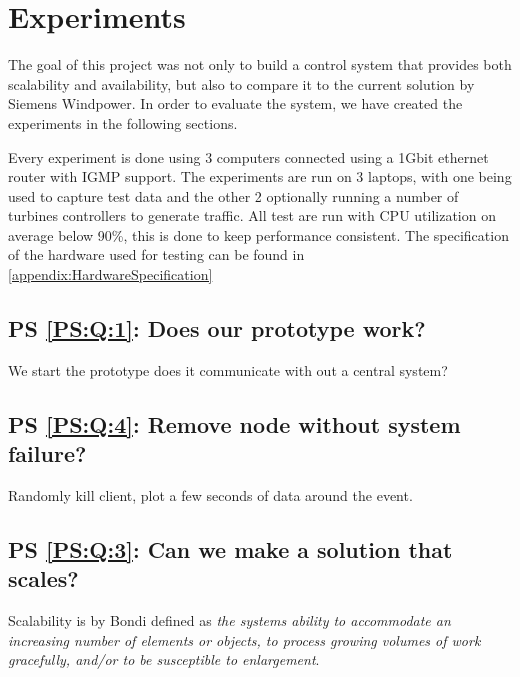 
\chapter{Experiments}


The goal of this project was not only to build a control system that provides both scalability and availability, but also to compare it to the current solution by Siemens Windpower. 
In order to evaluate the system, we have created the experiments in the following sections.

Every experiment is done using 3 computers connected using a 1Gbit ethernet router with IGMP support.
The experiments are run on 3 laptops, with one being used to capture test data and the other 2 optionally running a number of turbines controllers to generate traffic.
All test are run with CPU utilization on average below 90\%, this is done to keep performance consistent.
The specification of the hardware used for testing can be found in \cref{appendix:HardwareSpecification}

\section{PS \ref{PS:Q:1}: Does our prototype work?}
We start the prototype does it communicate with out a central system?


\section{PS \ref{PS:Q:4}: Remove node without system failure?}
Randomly kill client, plot a few seconds of data around the event.

\section{PS \ref{PS:Q:3}: Can we make a solution that scales?}
Scalability is by Bondi\cite{Bondi:2000:CSI:350391.350432} defined as \textit{the systems ability to accommodate an increasing number of elements or objects, to process growing volumes of work gracefully, and/or to be susceptible to enlargement}. 

